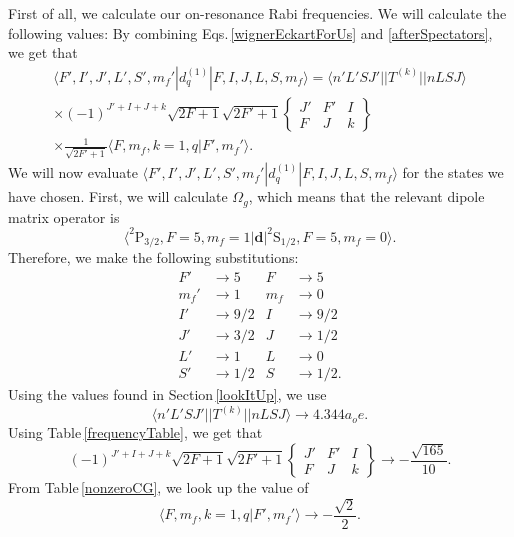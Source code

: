 First of all, we calculate our on-resonance Rabi frequencies. We will calculate the following values:
By combining Eqs.\,\eqref{wignerEckartForUs} and \eqref{afterSpectators}, we get that  
\begin{multline}
\langle F',I',J',L',S',m_f'|d^{(1)}_q|F,I,J,L,S,m_f\rangle =\langle n'L' S J'||T^{(k)}|| n L S J\rangle\\
\times (-1)^{J'+I+J+k}\sqrt{2F+1}\sqrt{2F'+1}
\begin{Bmatrix}
J' & F' & I \\
F & J & k
\end{Bmatrix}\\
\times\frac{1}{\sqrt{2F'+1}}\langle F,m_f,k=1,q|F',m_f'\rangle.
\end{multline}
We will now evaluate $\langle F',I',J',L',S',m_f'|d^{(1)}_q|F,I,J,L,S,m_f\rangle$ for the states we have chosen. First, we will calculate $\Omega_g$, which means that the relevant dipole matrix operator is 
\begin{equation}
{\langle^2\mathrm{P}_{3/2},F=5,m_f=1|\mathbf{d}|^2\mathrm{S}_{1/2},F=5,m_f=0\rangle}.
\end{equation}
Therefore, we make the following substitutions: 
\begin{align}        
F'&\rightarrow5&      F&\rightarrow5\\
m_f'&\rightarrow1&    m_f&\rightarrow0\\
I'&\rightarrow9/2&    I&\rightarrow9/2\\
J'&\rightarrow3/2&    J&\rightarrow1/2\\
L'&\rightarrow1&      L&\rightarrow0\\
S'&\rightarrow1/2&    S&\rightarrow1/2.
\end{align}
Using the values found in Section\,\ref{lookItUp}, we use 
\begin{equation}
\langle n'L' S J'||T^{(k)}|| n L S J\rangle \rightarrow 4.344 a_oe.
\end{equation}
Using Table\,\ref{frequencyTable}, we get that 
\begin{equation}
(-1)^{J'+I+J+k}\sqrt{2F+1}\sqrt{2F'+1}
\begin{Bmatrix}
J' & F' & I \\
F & J & k
\end{Bmatrix}\rightarrow
-\frac{\sqrt{165}}{10}.
\end{equation}
From Table\,\ref{nonzeroCG}, we look up the value of 
\begin{equation}
\langle F,m_f,k=1,q|F',m_f'\rangle\rightarrow-\frac{\sqrt{2}}{2}.
\end{equation}

